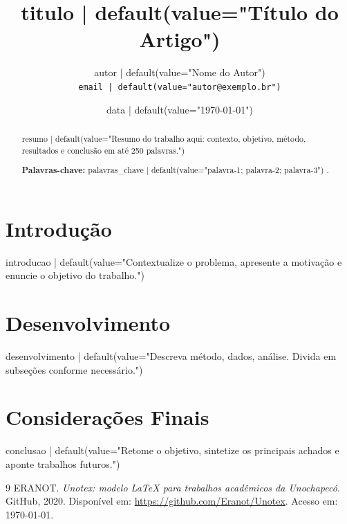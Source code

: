 \documentclass[12pt,a4paper,oneside]{article}
\title{\textbf{ {{ titulo | default(value="Título do Artigo") }} }}
\author{ {{ autor | default(value="Nome do Autor") }} \\
         \small\texttt{ {{ email | default(value="autor@exemplo.br") }} } }
\date{ {{ data | default(value="\today") }} }
\begin{document}
\maketitle

\begin{abstract}
    {{ resumo | default(value="Resumo do trabalho aqui: contexto, objetivo, método, resultados e conclusão em até 250 palavras.") }}

    \vspace{6pt}\noindent\textbf{Palavras-chave:} {{ palavras_chave | default(value="palavra-1; palavra-2; palavra-3") }}.
\end{abstract}

\section{Introdução}

{{ introducao | default(value="Contextualize o problema, apresente a motivação e enuncie o objetivo do trabalho.") }}

\section{Desenvolvimento}

{{ desenvolvimento | default(value="Descreva método, dados, análise. Divida em subseções conforme necessário.") }}

\section{Considerações Finais}

{{ conclusao | default(value="Retome o objetivo, sintetize os principais achados e aponte trabalhos futuros.") }}

\begin{thebibliography}{9}
     ERANOT. \textit{Unotex: modelo LaTeX para trabalhos acadêmicos da Unochapecó}. GitHub, 2020. Disponível em: \url{https://github.com/Eranot/Unotex}. Acesso em: \today.
\end{thebibliography}
\end{document}
